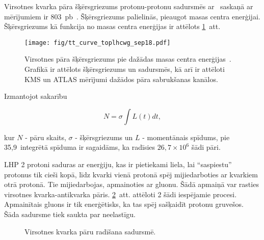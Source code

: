 Virsotnes kvarka pāra šķērsgriezums protonu-protonu sadursmēs ar ~\TeV saskaņā ar mērījumiem ir 803~pb~\cite{Sirunyan:2018goh}. Šķērsgriezums palielinās, pieaugot masas centra enerģijai. Šķērsgriezums kā funkcija no masas centra enerģijas ir attēlots \ref{fig:tt_curve_toplhcwg_sep18}~att.

\begin{figure}[hbtp]

  \centering
  \texttt{[image: fig/tt\_curve\_toplhcwg\_sep18.pdf]}
  \caption{Virsotnes pāra šķērsgriezums pie dažādas masas centra enerģijas~\cite{twiki:tt_curve_toplhcwg_sep18}. Grafikā ir attēlots šķērsgriezums \Pp\Pp un \Pp\Pap sadursmēs, kā arī ir attēloti KMS un ATLAS mērījumi dažādos \ttbar pāra sabrukšanas kanālos.}
  \label{fig:tt_curve_toplhcwg_sep18}
  
\end{figure}

Izmantojot sakarību

\begin{equation}
N=\sigma\int L(t)dt, 
\end{equation}

kur $N$ - \ttbar pāru skaits, $\sigma$ - \ttbar šķērsgriezums un $L$ - momentānais spīdums, pie 35,9~\fbinv integrētā spīduma ir sagaidāms, ka radīsies $26,7\times10^{6}$ šādi pāri. 

LHP 2 protoni saduras ar enerģiju, kas ir pietiekami liela, lai ``saspiestu'' protonus tik cieši kopā, līdz kvarki vienā protonā spēj mijiedarboties ar kvarkiem otrā protonā. Tie mijiedarbojas, apmainoties ar gluonu. Šādā apmaiņā var rasties virsotnes kvarka-antikvarka pāris. \ref{fig:top_quark_productions}~att. attēloti 2 šādi iespējamie procesi. Apmainītais gluons ir tik enerģētisks, ka tas spēj sašķaidīt protonu \gls{gruvešos}. Šāda sadursme tiek saukta par neelastīgu.

\begin{figure}[h!]
  \centering
  \def\twidth{0.3}
  \hfil

  \caption{Virsotnes kvarka pāru radīšana \Pp\Pp sadursmē.}
  \label{fig:top_quark_productions}
\end{figure}

